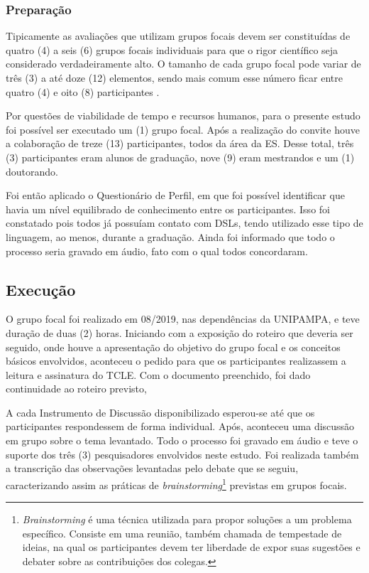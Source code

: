 \subsubsection{Preparação}

Tipicamente as avaliações que utilizam grupos focais devem ser constituídas de quatro (4) a seis (6) grupos focais individuais para que o rigor científico seja considerado verdadeiramente alto. 
O tamanho de cada grupo focal pode variar de três (3) a até doze (12) elementos, sendo mais comum esse número ficar entre quatro (4) e oito (8) participantes \cite{Kontio:2008}. 

Por questões de viabilidade de tempo e recursos humanos, para o presente estudo foi possível ser executado um (1) grupo focal. 
Após a realização do convite houve a colaboração de treze (13) participantes, todos da área da \ac{ES}. 
Desse total, três (3) participantes eram alunos de graduação, nove (9) eram mestrandos e um (1) doutorando. 

Foi então aplicado o Questionário de Perfil, em que foi possível identificar que havia um nível equilibrado de conhecimento entre os participantes. 
Isso foi constatado pois todos já possuíam contato com \acp{DSL}, tendo utilizado esse tipo de linguagem, ao menos, durante a graduação.
Ainda foi informado que todo o processo seria gravado em áudio, fato com o qual todos concordaram.

\subsection{Execução}

O grupo focal foi realizado em 08/2019, nas dependências da UNIPAMPA, e teve duração de duas (2) horas. 
Iniciando com a exposição do roteiro que deveria ser seguido, onde houve a apresentação do objetivo do grupo focal e os conceitos básicos envolvidos, aconteceu o pedido para que os participantes realizassem a leitura e assinatura do \ac{TCLE}. 
Com o documento preenchido, foi dado continuidade ao roteiro previsto, 

A cada Instrumento de Discussão disponibilizado esperou-se até que os participantes respondessem de forma individual. 
Após, aconteceu uma discussão em grupo sobre o tema levantado. 
Todo o processo foi gravado em áudio e teve o suporte dos três (3) pesquisadores envolvidos neste estudo. 
Foi realizada também a transcrição das observações levantadas pelo debate que se seguiu, caracterizando assim as práticas de \textit{brainstorming}\footnote{\textit{Brainstorming} é uma técnica utilizada para propor soluções a um problema específico. Consiste em uma reunião, também chamada de tempestade de ideias, na qual os participantes devem ter liberdade de expor suas sugestões e debater sobre as contribuições dos colegas.} previstas em grupos focais. 


